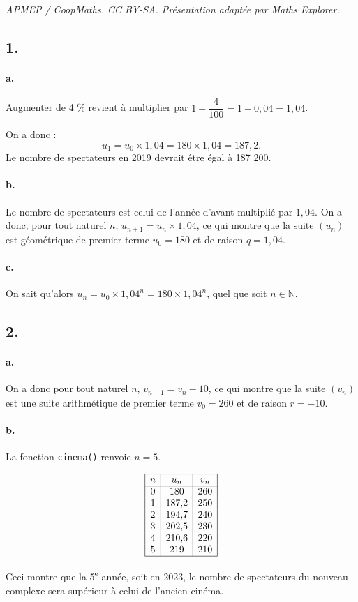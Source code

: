 \documentclass[10pt]{article}
\begin{document}
\noindent\textit{APMEP / CoopMaths. CC BY-SA. Présentation adaptée par Maths Explorer.}\par\medskip
\subsection*{1.}

\paragraph{a.} Augmenter de 4 \% revient à multiplier par \(1 + \dfrac{4}{100} = 1 + 0{,}04 = 1{,}04\).

On a donc :
\[
u_1 = u_0 \times 1{,}04 = 180 \times 1{,}04 = 187{,}2.
\]
Le nombre de spectateurs en 2019 devrait être égal à 187 200.

\paragraph{b.} Le nombre de spectateurs est celui de l'année d'avant multiplié par \(1{,}04\). On a donc, pour tout naturel \(n\), \(u_{n+1} = u_n \times 1{,}04\), ce qui montre que la suite \((u_n)\) est géométrique de premier terme \(u_0 = 180\) et de raison \(q = 1{,}04\).

\paragraph{c.} On sait qu'alors \(u_n = u_0 \times 1{,}04^n = 180 \times 1{,}04^n\), quel que soit \(n \in \mathbb{N}\).

\subsection*{2.}

\paragraph{a.} On a donc pour tout naturel \( n \), \( v_{n+1} = v_n - 10 \), ce qui montre que la suite \( (v_n) \) est une suite arithmétique de premier terme \( v_0 = 260 \) et de raison \(r = -10\).


\paragraph{b.} La fonction \texttt{cinema()} renvoie \( n = 5 \).

\[
\begin{array}{|c|c|c|}
\hline
n & u_n & v_n \\
\hline
0 & 180 & 260 \\
1 & 187{,}2 & 250 \\
2 & 194{,}7 & 240 \\
3 & 202{,}5 & 230 \\
4 & 210{,}6 & 220 \\
5 & 219 & 210 \\
\hline
\end{array}
\]

Ceci montre que la 5\textsuperscript{e} année, soit en 2023, le nombre de spectateurs du nouveau complexe sera supérieur à celui de l'ancien cinéma.
\end{document}
